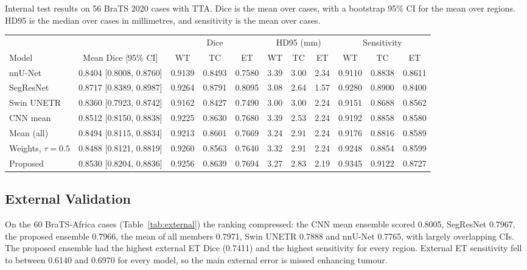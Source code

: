 \documentclass[a4paper,fleqn]{cas-sc}
\begin{document}
\begin{heretable}
\centering
\caption{Internal test results on 56 BraTS 2020 cases with TTA. Dice is the mean over cases, with a bootstrap 95\% CI for the mean over regions. HD95 is the median over cases in millimetres, and sensitivity is the mean over cases.}
\label{tab:internal}
\scriptsize
\setlength{\tabcolsep}{2.5pt}
\begin{tabular*}{\textwidth}{@{\extracolsep{\fill}}lcccccccccc@{}}
\toprule
 & & \multicolumn{3}{c}{Dice} & \multicolumn{3}{c}{HD95 (mm)} & \multicolumn{3}{c}{Sensitivity} \\
\cmidrule(lr){3-5}\cmidrule(lr){6-8}\cmidrule(l){9-11}
Model & Mean Dice [95\% CI] & WT & TC & ET & WT & TC & ET & WT & TC & ET \\
\midrule
nnU-Net & 0.8404 [0.8008, 0.8760] & 0.9139 & 0.8493 & 0.7580 & 3.39 & 3.00 & 2.34 & 0.9110 & 0.8838 & 0.8611 \\
SegResNet & 0.8717 [0.8389, 0.8987] & 0.9264 & 0.8791 & 0.8095 & 3.08 & 2.64 & 1.57 & 0.9280 & 0.8900 & 0.8400 \\
Swin UNETR & 0.8360 [0.7923, 0.8742] & 0.9162 & 0.8427 & 0.7490 & 3.00 & 3.00 & 2.24 & 0.9151 & 0.8688 & 0.8562 \\
CNN mean & 0.8512 [0.8150, 0.8838] & 0.9225 & 0.8630 & 0.7680 & 3.39 & 2.53 & 2.24 & 0.9192 & 0.8858 & 0.8580 \\
Mean (all) & 0.8494 [0.8115, 0.8834] & 0.9213 & 0.8601 & 0.7669 & 3.24 & 2.91 & 2.24 & 0.9176 & 0.8816 & 0.8589 \\
Weights, $\tau=0.5$ & 0.8488 [0.8121, 0.8819] & 0.9260 & 0.8563 & 0.7640 & 3.32 & 2.91 & 2.24 & 0.9248 & 0.8854 & 0.8599 \\
Proposed & 0.8530 [0.8204, 0.8836] & 0.9256 & 0.8639 & 0.7694 & 3.27 & 2.83 & 2.19 & 0.9345 & 0.9122 & 0.8727 \\
\bottomrule
\end{tabular*}
\end{heretable}

\subsection{External Validation}
\label{sec:external}

On the 60 BraTS-Africa cases (Table~\ref{tab:external}) the ranking compressed: the CNN mean ensemble scored 0.8005, SegResNet 0.7967, the proposed ensemble 0.7966, the mean of all members 0.7971, Swin UNETR 0.7888 and nnU-Net 0.7765, with largely overlapping CIs. The proposed ensemble had the highest external ET Dice (0.7411) and the highest sensitivity for every region. External ET sensitivity fell to between 0.6140 and 0.6970 for every model, so the main external error is missed enhancing tumour.
\end{document}
